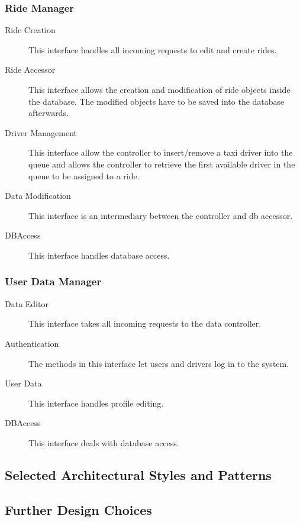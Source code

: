 	\subsubsection{Ride Manager}
		\begin{description}
			\item[Ride Creation]
				This interface handles all incoming requests to edit and create rides.
			\item[Ride Accessor]
				This interface allows the creation and modification of ride objects inside the database. The modified objects have to be saved into the database afterwards.
			\item[Driver Management]
				This interface allow the controller to insert/remove a taxi driver into the queue and allows the controller to retrieve the first available driver in the queue to be assigned to
				a ride.
			\item[Data Modification]
				This interface is an intermediary between the controller and db accessor. 
			\item[DBAccess]
				This interface handles database access.
		\end{description}
	\subsubsection{User Data Manager}
		\begin{description}
			\item[Data Editor]
				This interface takes all incoming requests to the data controller.
			\item[Authentication]
				The methods in this interface let users and drivers log in to the system.
			\item[User Data]
				This interface handles profile editing.
			\item[DBAccess]	
				This interface deals with database access.
		\end{description}			
\subsection{Selected Architectural Styles and Patterns}

\subsection{Further Design Choices}

